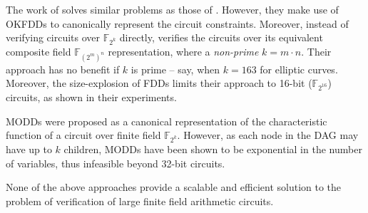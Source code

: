 The work of \cite{Mukho} solves similar problems as those of
\cite{Morioka}. However, they make use of OKFDDs \cite{okfdd} to 
canonically represent the circuit constraints. Moreover, instead of
verifying circuits over $\mathbb{F}_{2^k}$ directly, \cite{Mukho} verifies the
circuits over its equivalent composite field $\mathbb{F}_{(2^m)^{n}}$
representation, where a {\it non-prime} $k = m\cdot n$. Their approach
has no benefit if $k$ is prime -- say, when $k = 163$ for elliptic
curves. Moreover, the size-explosion of FDDs limits their
approach to 16-bit (${\mathbb{F}}_{2^{16}}$) circuits, as shown in
their experiments. 

MODDs \cite{modd} were proposed as a canonical representation of the characteristic function
of a circuit over finite field $\mathbb{F}_{2^k}$. However, as each node in the
DAG may have up to $k$ children, MODDs have been shown to be exponential in the number of
variables, thus infeasible beyond 32-bit circuits.  


None of the above approaches provide a scalable and efficient solution to the problem of verification of large finite field arithmetic circuits.

